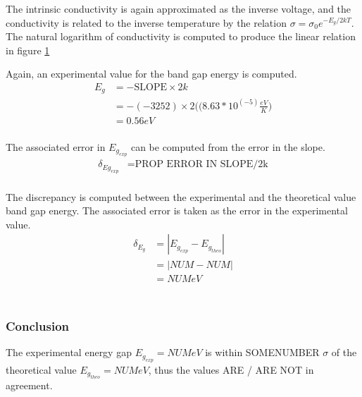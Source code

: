 \documentclass[a4paper]{article}
\begin{document}
\qq The intrinsic conductivity is again approximated as the inverse
voltage, and the conductivity is related to the inverse temperature by
the relation $\sigma = \sigma_0 e^{-E_g/2kT}$. The natural logarithm
of conductivity is computed to produce the linear relation in figure
\ref{task33plotLINEAR}

\begin{figure}[H]
\centering
\label{task33plotLINEAR}
\end{figure}

Again, an experimental value for the band gap energy is computed.
\begin{align*}
E_g &= - \text{SLOPE} \times 2k \\
    &= - (-3252) \times 2 
       \Big( (8.63 *10^(-5) \frac{eV}{K} \Big) \\
    &= 0.56 eV \\
\end{align*}

The associated error in $E_{g_{exp}}$ can be computed from the error in the slope.
\begin{align*}
\delta_{Eg_{exp}} &= \text{PROP ERROR IN SLOPE/2k} \\
\end{align*}

\qq The discrepancy is computed between the experimental and the
theoretical value band gap energy. The associated error is taken as
the error in the experimental value.
\begin{align*}
\delta_{E_g} &= | E_{g_{exp}} - E_{g_{theo}} | \\
		     &= | NUM - NUM| \\
		     &= NUM eV \\
\end{align*}\\

\subsubsection{Conclusion}
\qq The experimental energy gap $E_{g_{exp}} = NUM eV$ is within
SOMENUMBER $\sigma$ of the theoretical value $E_{g_{theo}} = NUM eV$,
thus the values ARE / ARE NOT in agreement.
\end{document}

